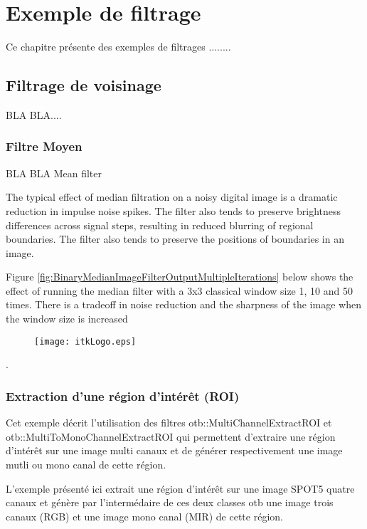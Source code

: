 \chapter{Exemple de filtrage}

Ce chapitre pr\'{e}sente des exemples de filtrages ........


\section{Filtrage de voisinage}
\label{sec:NeighborhoodFilters}

BLA BLA....


\subsection{Filtre Moyen}
\label{sec:MeanFilter}

\ifitkFullVersion

\fi

BLA BLA Mean filter


The typical effect of median filtration on a noisy digital image is a dramatic reduction in impulse noise spikes. The filter also tends to preserve brightness differences across signal steps, resulting in reduced blurring of regional boundaries. The filter also tends to preserve the positions of boundaries in an image.

Figure \ref{fig:BinaryMedianImageFilterOutputMultipleIterations} below shows the effect of running the median filter with a 3x3 classical window size 
1, 10 and 50 times. There is a tradeoff in noise reduction and the sharpness of the image when the window size is increased\begin{figure}
  \center
  \texttt{[image: itkLogo.eps]}
  \label{fig:itkLogo}
\end{figure}.

\subsection{Extraction d'une r\'egion d'int\'er\^et (ROI)}
\label{sec:ExtractROI}

Cet exemple d\'ecrit l'utilisation des filtres otb::MultiChannelExtractROI et
otb::MultiToMonoChannelExtractROI qui permettent d'extraire une r\'egion d'int\'er\^et
sur une image multi canaux et de g\'en\'erer respectivement une image mutli ou 
mono canal de cette r\'egion.

L'exemple pr\'esent\'e ici extrait une r\'egion d'int\'er\^et sur une image SPOT5 
quatre canaux et g\'en\`ere par l'interm\'edaire de ces deux classes otb une image trois 
canaux (RGB) et une image mono canal (MIR) de cette r\'egion. 


\ifitkFullVersion

\fi


